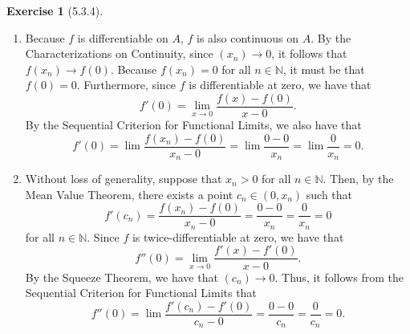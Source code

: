 \documentclass{amsart}
\theoremstyle{definition}
\newtheorem{exercise}{Exercise}
\newcommand{\N}{\mathbb{N}}
\begin{document}
\begin{exercise}[5.3.4]
  \begin{enumerate}[label={(\alph*)}]
    \item Because $f$ is differentiable on $A$, $f$ is also continuous on $A$.
      By the Characterizations on Continuity, since $(x_n) \to 0$, it follows
      that $f(x_n) \to f(0)$. Because $f(x_n) = 0$ for all $n \in \N$, it must
      be that $f(0) = 0$. Furthermore, since $f$ is differentiable at zero, we
      have that
      \[
        f'(0) = \lim_{x \to 0} \frac{f(x) - f(0)}{x - 0}.
      \]
      By the Sequential Criterion for Functional Limits, we also have that
      \[
        f'(0) = \lim \frac{f(x_n) - f(0)}{x_n - 0} = \lim \frac{0 - 0}{x_n} =
        \lim \frac{0}{x_n} = 0.
      \]
    \item Without loss of generality, suppose that $x_n > 0$ for all $n \in \N$.
      Then, by the Mean Value Theorem, there exists a point $c_n \in (0, x_n)$
      such that
      \[
        f'(c_n) = \frac{f(x_n) - f(0)}{x_n - 0} = \frac{0 - 0}{x_n} =
        \frac{0}{x_n} = 0
      \]
      for all $n \in \N$. Since $f$ is twice-differentiable at zero, we have
      that
      \[
        f''(0) = \lim_{x \to 0} \frac{f'(x) - f'(0)}{x - 0}.
      \]
      By the Squeeze Theorem, we have that $(c_n) \to 0$. Thus, it follows from
      the Sequential Criterion for Functional Limits that
      \[
        f''(0) = \lim \frac{f'(c_n) - f'(0)}{c_n - 0} = \frac{0 - 0}{c_n} =
        \frac{0}{c_n} = 0.
      \]
  \end{enumerate}
\end{exercise}
\end{document}
